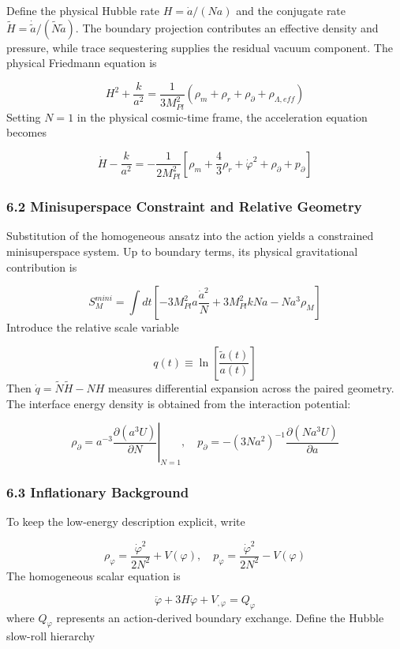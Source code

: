 \documentclass[aps,prd,onecolumn,superscriptaddress,nofootinbib,longbibliography,10pt]{revtex4-2}
\begin{document}
  Define the physical Hubble rate \(H = \dot{a}/(Na)\) and the conjugate rate \(\tilde{H} = \dot{\tilde{a}}/(\tilde{N}\tilde{a})\). The boundary projection contributes an effective density and pressure, while trace sequestering supplies the residual vacuum component. The physical Friedmann equation is


  \[ H^2 + \frac{k}{a^2} = \frac{1}{3M_{Pl}^2}(\rho_m + \rho_r + \rho_\partial + \rho_{\Lambda,eff}) \]
  Setting \(N = 1\) in the physical cosmic-time frame, the acceleration equation becomes


  \[ \dot{H} - \frac{k}{a^2} = -\frac{1}{2M_{Pl}^2}\left[ \rho_m + \frac{4}{3}\rho_r + \dot{\varphi}^2 + \rho_\partial + p_\partial \right] \]

  
\subsubsection*{6.2 Minisuperspace Constraint and Relative Geometry}

  Substitution of the homogeneous ansatz into the action yields a constrained minisuperspace system. Up to boundary terms, its physical gravitational contribution is


  \[ S_M^{mini} = \int dt \left[ -3M_{Pl}^2 a \frac{\dot{a}^2}{N} + 3M_{Pl}^2 k N a - N a^3 \rho_M \right] \]
  Introduce the relative scale variable


  \[ q(t) \equiv \ln\left[\frac{\tilde{a}(t)}{a(t)}\right] \]
  Then \(\dot{q} = \tilde{N}\tilde{H} - NH\) measures differential expansion across the paired geometry. The interface energy density is obtained from the interaction potential:


  \[ \rho_\partial = \left. a^{-3}\frac{\partial(a^3 U)}{\partial N}\right|_{N=1}, \quad p_\partial = -(3Na^2)^{-1}\frac{\partial(Na^3 U)}{\partial a} \]

  
\subsubsection*{6.3 Inflationary Background}

  To keep the low-energy description explicit, write


  \[ \rho_\varphi = \frac{\dot{\varphi}^2}{2N^2} + V(\varphi), \quad p_\varphi = \frac{\dot{\varphi}^2}{2N^2} - V(\varphi) \]
  The homogeneous scalar equation is


  \[ \ddot{\varphi} + 3H\dot{\varphi} + V_{,\varphi} = Q_\varphi \]
  where \(Q_\varphi\) represents an action-derived boundary exchange. Define the Hubble slow-roll hierarchy
\end{document}
